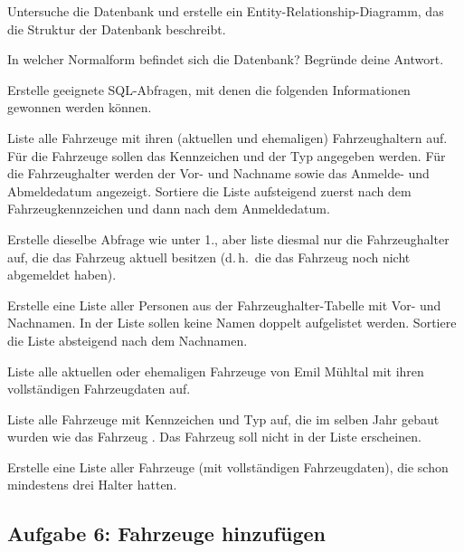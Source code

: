 \begin{compactenum}[a)]
\item Untersuche die Datenbank und erstelle ein Entity-Relationship-Diagramm,
das die Struktur der Datenbank beschreibt.

\item In welcher Normalform befindet sich die Datenbank? Begründe deine Antwort.

\item Erstelle geeignete SQL-Abfragen, mit denen die folgenden Informationen
gewonnen werden können.
\begin{compactenum}[1.]
\item Liste alle Fahrzeuge mit ihren (aktuellen und ehemaligen) Fahrzeughaltern
auf. Für die Fahrzeuge sollen das Kennzeichen und der Typ angegeben werden. Für
die Fahrzeughalter werden der Vor- und Nachname sowie das Anmelde- und
Abmeldedatum angezeigt. Sortiere die Liste aufsteigend zuerst nach dem
Fahrzeugkennzeichen und dann nach dem Anmeldedatum.

\item Erstelle dieselbe Abfrage wie unter 1., aber liste diesmal nur die
Fahrzeughalter auf, die das Fahrzeug aktuell besitzen (d.\,h.\ die das Fahrzeug
noch nicht abgemeldet haben).

\item Erstelle eine Liste aller Personen aus der Fahrzeughalter-Tabelle mit Vor-
und Nachnamen. In der Liste sollen keine Namen doppelt aufgelistet werden.
Sortiere die Liste absteigend nach dem Nachnamen.

\item Liste alle aktuellen oder ehemaligen Fahrzeuge von Emil Mühltal mit ihren
vollständigen Fahrzeugdaten auf.

\item Liste alle Fahrzeuge mit Kennzeichen und Typ auf, die im selben Jahr
gebaut wurden wie das Fahrzeug . Das Fahrzeug
 soll nicht in der Liste erscheinen.

\item Erstelle eine Liste aller Fahrzeuge (mit vollständigen Fahrzeugdaten),
die schon mindestens drei Halter hatten.
\end{compactenum}
\end{compactenum}


\subsection{Aufgabe 6: Fahrzeuge hinzufügen}

